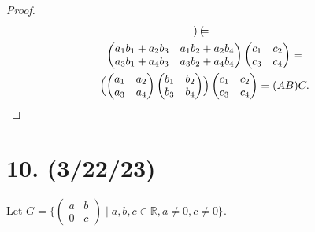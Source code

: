 \documentclass{article}
\begin{document}
\begin{proof}
\begin{multline*}
\begin{pmatrix}
        \end{pmatrix} = \\
        \begin{pmatrix}a_1 b_1 + a_2 b_3 & a_1 b_2 + a_2 b_4\\a_3 b_1 + a_4 b_3 & a_3 b_2 + a_4 b_4\end{pmatrix}\begin{pmatrix}c_1 & c_2 \\ c_3 & c_4\end{pmatrix} = \\
        \Bigl(\begin{pmatrix}a_1 & a_2\\a_3 & a_4\end{pmatrix}\begin{pmatrix}b_1 & b_2\\b_3 & b_4\end{pmatrix}\Bigr)\begin{pmatrix}c_1 & c_2\\c_3 & c_4\end{pmatrix} = (AB)C.
    \end{multline*}
\end{proof}

\section*{10. (3/22/23)}

Let $G = \{ \begin{pmatrix}a & b \\ 0 & c\end{pmatrix} \mid a, b, c \in \mathbb{R}, a \neq 0, c \neq 0 \}$.
\end{document}
